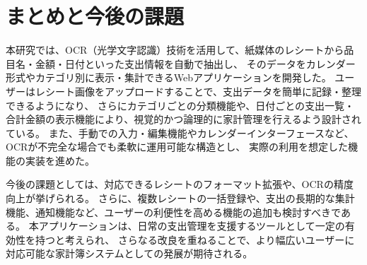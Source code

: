 \documentclass[main]{subfiles}
\begin{document}
\chapter{まとめと今後の課題}
\label{cha:conclusion}
本研究では、OCR（光学文字認識）技術を活用して、紙媒体のレシートから品目名・金額・日付といった支出情報を自動で抽出し、
そのデータをカレンダー形式やカテゴリ別に表示・集計できるWebアプリケーションを開発した。
ユーザーはレシート画像をアップロードすることで、支出データを簡単に記録・整理できるようになり、
さらにカテゴリごとの分類機能や、日付ごとの支出一覧・合計金額の表示機能により、視覚的かつ論理的に家計管理を行えるよう設計されている。
また、手動での入力・編集機能やカレンダーインターフェースなど、OCRが不完全な場合でも柔軟に運用可能な構造とし、
実際の利用を想定した機能の実装を進めた。

今後の課題としては、対応できるレシートのフォーマット拡張や、OCRの精度向上が挙げられる。
さらに、複数レシートの一括登録や、支出の長期的な集計機能、通知機能など、ユーザーの利便性を高める機能の追加も検討すべきである。
本アプリケーションは、日常の支出管理を支援するツールとして一定の有効性を持つと考えられ、
さらなる改良を重ねることで、より幅広いユーザーに対応可能な家計簿システムとしての発展が期待される。
\end{document}
